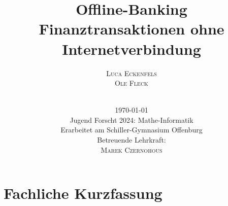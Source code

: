 \documentclass[a4paper,12pt,ngerman]{scrreport}
\title{Offline-Banking\\
    \vspace{6mm}
    \large{Finanztransaktionen ohne Internetverbindung}}
\author{\Large{\textsc{Luca Eckenfels}}\\\textsc{Ole Fleck}\\
    \vspace{5cm}\\
\date{\today\\\vspace{12mm}
Jugend Forscht 2024: Mathe-Informatik\\\vspace{6mm}
    Erarbeitet am Schiller-Gymnasium Offenburg\\
Betreuende Lehrkraft: \\\textsc{Marek Czernohous}}
}
\begin{document}


    \maketitle
    \tableofcontents
    \newpage
    \section*{Fachliche Kurzfassung}


    
    
    
    
    
\end{document}
